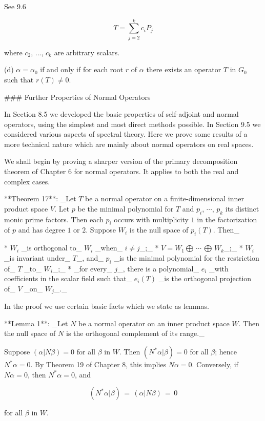 See 9.6

\[T=\sum_{j=2}^{k}c_{i}P_{j}\]

where \(c_{2}\), ..., \(c_{k}\) are arbitrary scalars.

(d) \(\alpha=\alpha_{0}\) if and only if for each root \(r\) of \(\alpha\) there exists an operator \(T\) in \(G_{0}\) such that \(r(T)\neq 0\).

### Further Properties of Normal Operators

In Section 8.5 we developed the basic properties of self-adjoint and normal operators, using the simplest and most direct methods possible. In Section 9.5 we considered various aspects of spectral theory. Here we prove some results of a more technical nature which are mainly about normal operators on real spaces.

We shall begin by proving a sharper version of the primary decomposition theorem of Chapter 6 for normal operators. It applies to both the real and complex cases.

**Theorem 17**: _Let \(T\) be a normal operator on a finite-dimensional inner product space \(V\). Let \(p\) be the minimal polynomial for \(T\) and \(p_{i}\), \(\cdots\), \(p_{k}\) its distinct monic prime factors. Then each \(p_{i}\) occurs with multiplicity \(1\) in the factorization of \(p\) and has degree \(1\) or \(2\). Suppose \(W_{i}\) is the null space of \(p_{i}(T)\). Then_

* \(W_{i}\) _is orthogonal to_ \(W_{i}\) _when_ \(i\neq j\)_;_
* \(V=W_{1}\bigoplus\,\cdots\,\bigoplus\,W_{k}\)_;_
* \(W_{i}\) _is invariant under_ \(T\)_, and_ \(p_{i}\) _is the minimal polynomial for the restriction of_ \(T\) _to_ \(W_{i}\)_;_
* _for every_ \(j\)_, there is a polynomial_ \(e_{i}\) _with coefficients in the scalar field such that_ \(e_{i}(T)\) _is the orthogonal projection of_ \(V\) _on_ \(W_{j}\)_._

In the proof we use certain basic facts which we state as lemmas.

**Lemma 1**: _Let \(N\) be a normal operator on an inner product space \(W\). Then the null space of \(N\) is the orthogonal complement of its range._

Suppose \((\alpha|N\beta)=0\) for all \(\beta\) in \(W\). Then \((N^{*}\alpha|\beta)=0\) for all \(\beta\); hence \(N^{*}\alpha=0\). By Theorem 19 of Chapter 8, this implies \(N\alpha=0\). Conversely, if \(N\alpha=0\), then \(N^{*}\alpha=0\), and

\[(N^{*}\alpha|\beta)\,=\,(\alpha|N\beta)\,=\,0\]

for all \(\beta\) in \(W\).

 